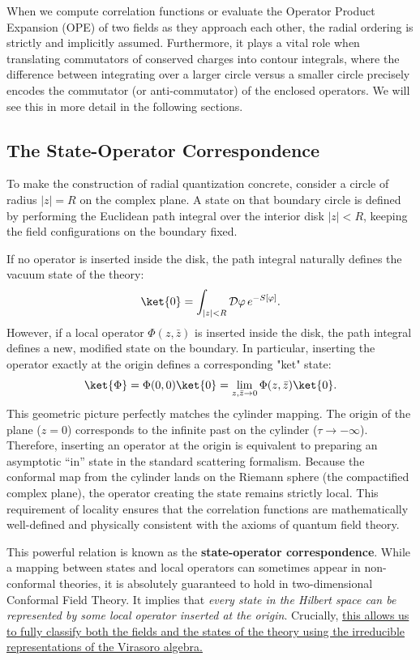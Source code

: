 When we compute correlation functions or evaluate the Operator Product Expansion (OPE) of two fields as they approach each other, the radial ordering is strictly and implicitly assumed. Furthermore, it plays a vital role when translating commutators of conserved charges into contour integrals, where the difference between integrating over a larger circle versus a smaller circle precisely encodes the commutator (or anti-commutator) of the enclosed operators. We will see this in more detail in the following sections.

\subsection{The State-Operator Correspondence}

To make the construction of radial quantization concrete, consider a circle of radius \(|z| = R\) on the complex plane. A state on that boundary circle is defined by performing the Euclidean path integral over the interior disk \(|z| < R\), keeping the field configurations on the boundary fixed.

If no operator is inserted inside the disk, the path integral naturally defines the vacuum state of the theory:
\[
    \ket{0} = \int_{|z| < R} \mathcal{D}\varphi \, e^{-S[\varphi]} .
\]
However, if a local operator \(\Phi(z, \bar{z})\) is inserted inside the disk, the path integral defines a new, modified state on the boundary. In particular, inserting the operator exactly at the origin defines a corresponding "ket" state:
\[
    \ket{\Phi} = \Phi(0,0)\ket{0} = \lim_{z,\bar{z} \to 0} \Phi(z,\bar{z})\ket{0}.
\]
This geometric picture perfectly matches the cylinder mapping. The origin of the plane (\(z=0\)) corresponds to the infinite past on the cylinder (\(\tau \to -\infty\)). Therefore, inserting an operator at the origin is equivalent to preparing an asymptotic ``in'' state in the standard scattering formalism. Because the conformal map from the cylinder lands on the Riemann sphere (the compactified complex plane), the operator creating the state remains strictly local. This requirement of locality ensures that the correlation functions are mathematically well-defined and physically consistent with the axioms of quantum field theory.

This powerful relation is known as the \textbf{state-operator correspondence}. While a mapping between states and local operators can sometimes appear in non-conformal theories, it is absolutely guaranteed to hold in two-dimensional Conformal Field Theory. It implies that \textit{every state in the Hilbert space can be represented by some local operator inserted at the origin}. Crucially, \uline{this allows us to fully classify both the fields and the states of the theory using the irreducible representations of the Virasoro algebra.}

